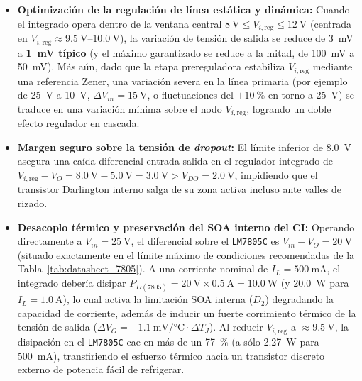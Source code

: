 \begin{itemize}
    \item \textbf{Optimización de la regulación de línea estática y dinámica:} Cuando el integrado opera dentro de la ventana central $\SI{8}{\volt} \le V_{i,\text{reg}} \le \SI{12}{\volt}$ (centrada en $V_{i,\text{reg}} \approx \SI{9,5}{\volt}\text{--}\SI{10,0}{\volt}$), la variación de tensión de salida se reduce de \SI{3}{\milli\volt} a \textbf{\SI{1}{\milli\volt} típico} (y el máximo garantizado se reduce a la mitad, de \SI{100}{\milli\volt} a \SI{50}{\milli\volt}). Más aún, dado que la etapa prereguladora estabiliza $V_{i,\text{reg}}$ mediante una referencia Zener, una variación severa en la línea primaria (por ejemplo de \SI{25}{\volt} a \SI{10}{\volt}, $\Delta V_{in} = \SI{15}{\volt}$, o fluctuaciones del $\pm \SI{10}{\percent}$ en torno a \SI{25}{\volt}) se traduce en una variación mínima sobre el nodo $V_{i,\text{reg}}$, logrando un doble efecto regulador en cascada.
    \item \textbf{Margen seguro sobre la tensión de \emph{dropout}:} El límite inferior de \SI{8,0}{\volt} asegura una caída diferencial entrada-salida en el regulador integrado de $V_{i,\text{reg}} - V_O = \SI{8,0}{\volt} - \SI{5,0}{\volt} = \SI{3,0}{\volt} > V_{DO} = \SI{2,0}{\volt}$, impidiendo que el transistor Darlington interno salga de su zona activa incluso ante valles de rizado.
    \item \textbf{Desacoplo térmico y preservación del SOA interno del CI:} Operando directamente a $V_{in} = \SI{25}{\volt}$, el diferencial sobre el \texttt{LM7805C} es $V_{in} - V_O = \SI{20}{\volt}$ (situado exactamente en el límite máximo de condiciones recomendadas de la Tabla~\ref{tab:datasheet_7805}). A una corriente nominal de $I_L = \SI{500}{\milli\ampere}$, el integrado debería disipar $P_{D(\text{7805})} = \SI{20}{\volt} \times \SI{0,5}{\ampere} = \SI{10,0}{\watt}$ (y \SI{20,0}{\watt} para $I_L = \SI{1,0}{\ampere}$), lo cual activa la limitación SOA interna ($D_2$) degradando la capacidad de corriente, además de inducir un fuerte corrimiento térmico de la tensión de salida ($\Delta V_O = \SI{-1,1}{\milli\volt\per\celsius} \cdot \Delta T_J$). Al reducir $V_{i,\text{reg}}$ a $\approx \SI{9,5}{\volt}$, la disipación en el \texttt{LM7805C} cae en más de un \SI{77}{\percent} (a sólo \SI{2,27}{\watt} para \SI{500}{\milli\ampere}), transfiriendo el esfuerzo térmico hacia un transistor discreto externo de potencia fácil de refrigerar.
\end{itemize}
